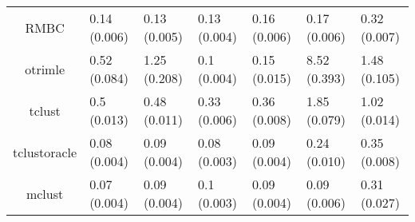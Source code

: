 \begin{longtable}{cllllll}
\midrule
RMBC & 0.14 (0.006) & 0.13 (0.005) & 0.13 (0.004) & 0.16 (0.006) & 0.17 (0.006) & 0.32 (0.007) \\ 
otrimle & 0.52 (0.084) & 1.25 (0.208) & 0.1 (0.004) & 0.15 (0.015) & 8.52 (0.393) & 1.48 (0.105) \\ 
tclust & 0.5 (0.013) & 0.48 (0.011) & 0.33 (0.006) & 0.36 (0.008) & 1.85 (0.079) & 1.02 (0.014) \\ 
tclustoracle & 0.08 (0.004) & 0.09 (0.004) & 0.08 (0.003) & 0.09 (0.004) & 0.24 (0.010) & 0.35 (0.008) \\ 
mclust & 0.07 (0.004) & 0.09 (0.004) & 0.1 (0.003) & 0.09 (0.004) & 0.09 (0.006) & 0.31 (0.027) \\ 
\bottomrule
\end{longtable}

